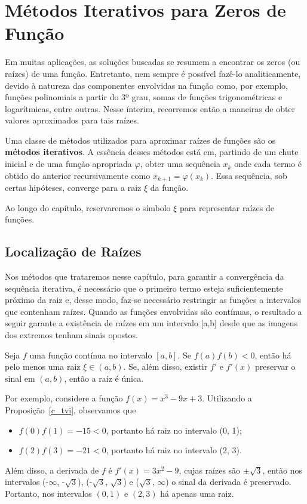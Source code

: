 \chapter{Métodos Iterativos para Zeros de Função}

Em muitas aplicações, as soluções buscadas se resumem a encontrar os zeros (ou raízes) de uma função. Entretanto, nem sempre é possível fazê-lo analiticamente, devido à natureza das componentes envolvidas na função como, por exemplo, funções polinomiais a partir do 3º grau, somas de funções trigonométricas e logarítmicas, entre outras. Nesse ínterim, recorremos então a maneiras de obter valores aproximados para tais raízes. 

Uma classe de métodos utilizados para aproximar raízes de funções são os \textbf{métodos iterativos}. A essência desses métodos está em, partindo de um chute inicial e de uma função apropriada $\varphi$, obter uma sequência $x_k$ onde cada termo é obtido do anterior recursivamente como $x_{k+1} = \varphi(x_k)$. Essa sequência, sob certas hipóteses, converge para a raiz $\xi$ da função.


Ao longo do capítulo, reservaremos o símbolo $\xi$ para representar raízes de funções.

\section{Localização de Raízes}

Nos métodos que trataremos nesse capítulo, para garantir a convergência da sequência iterativa, é necessário que o primeiro termo esteja suficientemente próximo da raiz e, desse modo, faz-se necessário restringir as funções a intervalos que contenham raízes. Quando as funções envolvidas são contínuas, o resultado a seguir garante a existência de raízes em um intervalo [a,b] desde que as imagens dos extremos tenham sinais opostos.

\begin{prop}\label{c_tvi}%
Seja $f$ uma função contínua no intervalo $[a, b]$. Se $f(a)f(b) < 0$, então há pelo menos uma raiz $\xi \in (a,b)$. Se, além disso, existir $f'$ e $f'(x)$ preservar o sinal em $(a,b)$, então a raiz é única.
\end{prop} %
Por exemplo, considere a função $f(x) = x^3 - 9x + 3$. Utilizando a Proposição~\ref{c_tvi}, observamos que
\begin{itemize}
    \item $f(0)f(1) = -15 < 0$, portanto há raiz no intervalo (0, 1);
    \item $f(2)f(3) = -21 < 0$, portanto há raiz no intervalo (2, 3).
\end{itemize}
Além disso, a derivada de $f$ é $f'(x) = 3x^2 - 9$, cujas raízes são $\pm \sqrt{3}$, então nos intervalos (-$\infty$, -$\sqrt{3}$), (-$\sqrt{3}$, $\sqrt{3}$) e ($\sqrt{3}$, $\infty$) o sinal da derivada é preservado. Portanto, nos intervalos $(0, 1)$ e $(2, 3)$ há apenas uma raiz.

